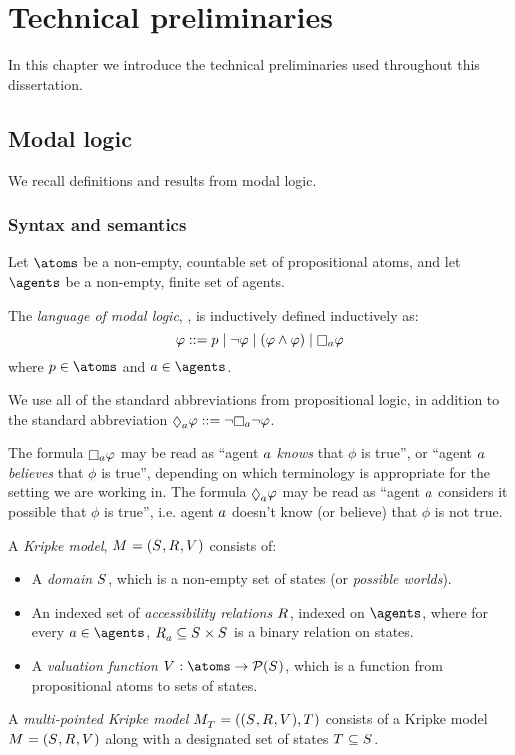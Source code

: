 \chapter{Technical preliminaries}

In this chapter we introduce the technical preliminaries used throughout this dissertation.

\section{Modal logic}

We recall definitions and results from modal logic.

\subsection{Syntax and semantics}

Let $\atoms$ be a non-empty, countable set of propositional atoms, and
let $\agents$ be a non-empty, finite set of agents.

\begin{definition}
The {\em language of modal logic}, \langMl{}, is inductively defined inductively as:
$$
\phi ::= 
    \atomP \mid
    \lnot \phi \mid
    (\phi \land \phi) \mid
    \necessary[\agentA] \phi
$$
where $\atomP \in \atoms$ and $\agentA \in \agents$.
\end{definition}

We use all of the standard abbreviations from propositional logic, in addition to the standard abbreviation $\possible[\agentA] \phi ::= \lnot \necessary[\agentA] \lnot \phi$.

The formula $\necessary[\agentA] \phi$ may be read as ``agent $a$ {\em knows} that $\phi$ is true'', or ``agent $a$ {\em believes} that $\phi$ is true'', depending on which terminology is appropriate for the setting we are working in.
The formula $\possible[\agentA] \phi$ may be read as ``agent $a$ considers it possible that $\phi$ is true'', i.e. agent $a$ doesn't know (or believe) that $\phi$ is not true.

\begin{definition}
A {\em Kripke model}, $\modelAndTuple$ consists of:
\begin{itemize}
    \item A {\em domain} $\states$, which is a non-empty set of states (or {\em possible worlds}).
    \item An indexed set of {\em accessibility relations} $\accessibilityRel$, indexed on $\agents$, where for every $\agentA \in \agents$, $\accessibility{\agentA} \subseteq \states \times \states$ is a binary relation on states.
    \item A {\em valuation function} $\valuation : \atoms \to \powerset(\states)$, which is a function from propositional atoms to sets of states.
\end{itemize}
A {\em multi-pointed Kripke model} $\pointedModelAndTuple{\statesT}$ consists of a Kripke model $\modelAndTuple$ along with a designated set of states $\statesT \subseteq \states$.
\end{definition}

